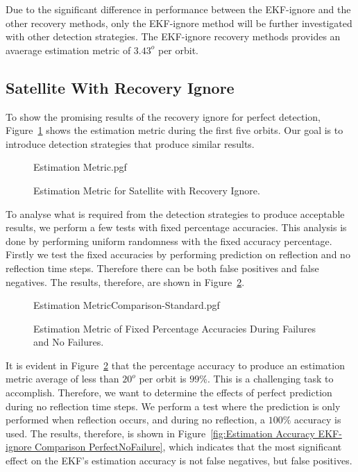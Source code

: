 \documentclass[letterpaper, 10 pt, conference]{ieeeconf}  %
\begin{document}
Due to the significant difference in performance between the EKF-ignore and the other recovery methods, only the EKF-ignore method will be further investigated with other detection strategies. The EKF-ignore recovery methods provides an avaerage estimation metric of $3.43^o$ per orbit.

\subsection{Satellite With Recovery Ignore}
To show the promising results of the recovery ignore for perfect detection, Figure~\ref{fig:Estimation Accuracy EKF-ignore} shows the estimation metric during the first five orbits. Our goal is to introduce detection strategies that produce similar results.

\begin{figure}[!htb]
	\begin{center}
		{Estimation Metric.pgf}
	\end{center}
	\caption[Estimation Metric for Satellite with Recovery Ignore]{Estimation Metric for Satellite with Recovery Ignore.}
	\label{fig:Estimation Accuracy EKF-ignore}
\end{figure}

To analyse what is required from the detection strategies to produce acceptable results, we perform a few tests with fixed percentage accuracies. This analysis is done by performing uniform randomness with the fixed accuracy percentage. Firstly we test the fixed accuracies by performing prediction on reflection and no reflection time steps. Therefore there can be both false positives and false negatives. The results, therefore, are shown in Figure~\ref{fig:Estimation Accuracy EKF-ignore Comparison}.

\begin{figure}[!htb]
	\begin{center}
		{Estimation MetricComparison-Standard.pgf}
	\end{center}
	\caption[Estimation Metric of Fixed Percentage Accuracies During Failures and No Failures]{Estimation Metric of Fixed Percentage Accuracies During Failures and No Failures.}
	\label{fig:Estimation Accuracy EKF-ignore Comparison}
\end{figure}

It is evident in Figure~\ref{fig:Estimation Accuracy EKF-ignore Comparison} that the percentage accuracy to produce an estimation metric average of less than $20^o$ per orbit is $99\%$. This is a challenging task to accomplish. Therefore, we want to determine the effects of perfect prediction during no reflection time steps. We perform a test where the prediction is only performed when reflection occurs, and during no reflection, a $100\%$ accuracy is used. The results, therefore, is shown in Figure~\ref{fig:Estimation Accuracy EKF-ignore Comparison PerfectNoFailure}, which indicates that the most significant effect on the EKF's estimation accuracy is not false negatives, but false positives.
\end{document}
